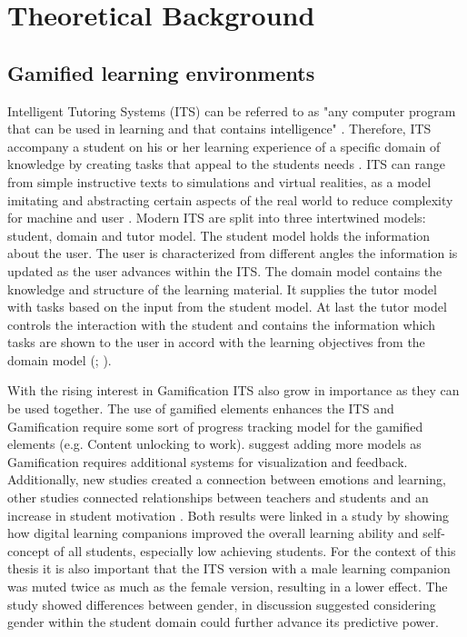 \section{Theoretical Background}

\subsection{Gamified learning environments}
Intelligent Tutoring Systems (ITS) can be referred to as "any computer program that can be used in learning and that contains intelligence" \>\parencite{freedmanLinksWhatIntelligent2000}.
Therefore, ITS accompany a student on his or her learning experience of a specific domain of knowledge by creating tasks that appeal to the students needs \parencite{gonzalezGamificationIntelligentTutoring2014}.
ITS can range from simple instructive texts to simulations and virtual realities, as a model imitating and abstracting certain aspects of the real world to reduce complexity for machine and user \parencite{psotkaIntelligentTutoringSystems1988}.
Modern ITS are split into three intertwined models: student, domain and tutor model. The student model holds the information about the user.
The user is characterized from different angles the information is updated as the user advances within the ITS.
The domain model contains the knowledge and structure of the learning material. It supplies the tutor model with tasks based on the input from the student model.
At last the tutor model controls the interaction with the student and contains the information which tasks are shown to the user in accord with the learning objectives from the domain model (\cite{gonzalezGamificationIntelligentTutoring2014}; \cite{freedmanLinksWhatIntelligent2000}).

With the rising interest in Gamification ITS also grow in importance as they can be used together. The use of gamified elements enhances the ITS and Gamification require some sort of progress tracking model for the gamified elements (e.g. Content unlocking to work).
\Textcite{gonzalezGamificationIntelligentTutoring2014} suggest adding more models as Gamification requires additional systems for visualization and feedback.
Additionally, new studies created a connection between emotions and learning, other studies connected relationships between teachers and students and an increase in student motivation \parencite{woolfAffectiveTutorsAutomatic2010}.
Both results were linked in a study by \Textcite{woolfAffectiveTutorsAutomatic2010} showing how digital learning companions improved the overall learning ability and self-concept of all students, especially low achieving students.
For the context of this thesis it is also important that the ITS version with a male learning companion was muted twice as much as the female version, resulting in a lower effect.
The study showed differences between gender, in discussion \Textcite{woolfAffectiveTutorsAutomatic2010} suggested considering gender within the student domain could further advance its predictive power.


